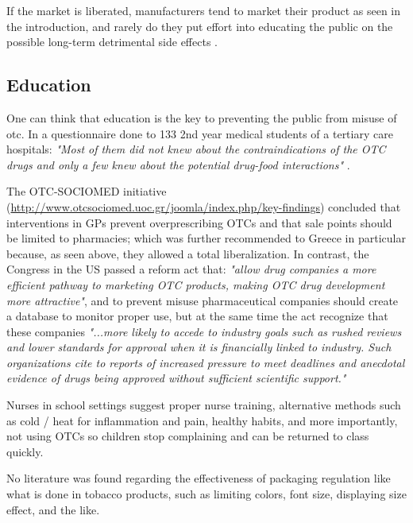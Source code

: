 If the market is liberated, manufacturers tend to market their product as seen in the introduction, and rarely do they put effort into educating the public on the possible long-term detrimental side effects \cite{Ino2022}.

\subsection{ Education }

One can think that education is the key to preventing the public from misuse of \gls{otc}. In a questionnaire done to 133 2nd year medical students of a tertiary care hospitals:\textit{ "Most of them did not knew about the contraindications of the OTC drugs and only a few knew about the potential drug-food interactions"} \cite{Prabhuswamy2022}.

The OTC-SOCIOMED initiative (\url{http://www.otcsociomed.uoc.gr/joomla/index.php/key-findings}) concluded \cite{https://doi.org/10.26220/aca.2981} that interventions in GPs prevent overprescribing OTCs and that sale points should be limited to pharmacies; which was further recommended to Greece in particular because, as seen above, they allowed a total liberalization. In contrast, the Congress in the US passed a reform act \cite{Gardiner2021} that: \textit{"allow drug companies a more efficient pathway to marketing OTC products, making OTC drug development more attractive"}, and to prevent misuse pharmaceutical companies should create a database to monitor proper use, but at the same time the act recognize that these companies \textit{"...more likely to accede to industry goals such as rushed reviews and lower standards for approval when it is financially linked to industry. Such organizations cite to reports of increased pressure to meet deadlines and anecdotal evidence of drugs being approved without sufficient scientific support."}

Nurses in school settings suggest proper nurse training, alternative methods such as cold / heat for inflammation and pain, healthy habits, and more importantly, not using OTCs so children stop complaining and can be returned to class quickly. \cite{Wallace2016}

No literature was found regarding the effectiveness of packaging regulation like what is done in tobacco products, such as limiting colors, font size, displaying size effect, and the like.



